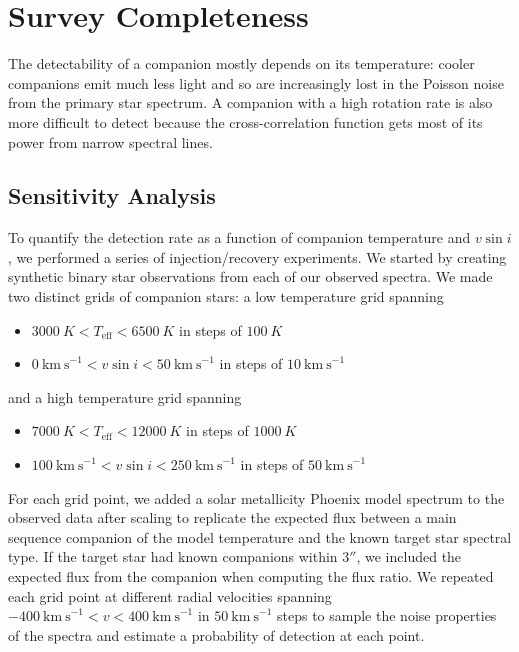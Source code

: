 \documentclass{emulateapj}
\begin{document}
\section{Survey Completeness}
\label{sec:completeness}

The detectability of a companion mostly depends on its temperature: cooler companions emit much less light and so are increasingly lost in the Poisson noise from the primary star spectrum. A companion with a high rotation rate is also more difficult to detect because the cross-correlation function gets most of its power from narrow spectral lines.  

\subsection{Sensitivity Analysis}

To quantify the detection rate as a function of companion temperature and $v\sin{i}$, we performed a series of injection/recovery experiments. We started by creating synthetic binary star observations from each of our observed spectra. We made two distinct grids of companion stars: a low temperature grid spanning

\begin{itemize}
\item $3000\ K < T_\mathrm{eff} < 6500\ K$ in steps of $100\ K$
\item $0\ \mathrm{km\ s}^{-1} < v\sin{i} < 50\ \mathrm{km\ s}^{-1}$ in steps of $10\ \mathrm{km\ s}^{-1}$
\end{itemize}
and a high temperature grid spanning

\begin{itemize}
\item $7000\ K < T_\mathrm{eff} < 12000\ K$ in steps of $1000\ K$
\item $100\ \mathrm{km\ s}^{-1} < v\sin{i} < 250\ \mathrm{km\ s}^{-1}$ in steps of $50\ \mathrm{km\ s}^{-1}$
\end{itemize}
For each grid point, we added a solar metallicity Phoenix model spectrum to the observed data after scaling to replicate the expected flux between a main sequence companion of the model temperature and the known target star spectral type. If the target star had known companions within $3''$, we included the expected flux from the companion when computing the flux ratio. We repeated each grid point at different radial velocities spanning $-400\ \mathrm{km\ s}^{-1} < v < 400\ \mathrm{km\ s}^{-1}$ in $50\ \mathrm{km\ s}^{-1}$ steps to sample the noise properties of the spectra and estimate a probability of detection at each point.
\end{document}
